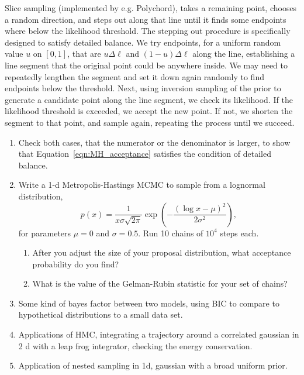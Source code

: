 Slice sampling (implemented by e.g. Polychord), takes a remaining point, chooses a random direction, and steps out along that line until it finds some endpoints where below the likelihood threshold.  The stepping out procedure is specifically designed to satisfy detailed balance.  We try endpoints, for a uniform random value $u$ on $[0,1]$, that are $u \Delta\ell$ and $(1-u) \Delta\ell$ along the line, establishing a line segment that the original point could be anywhere inside.  We may need to repeatedly lengthen the segment and set it down again randomly to find endpoints below the threshold.  Next, using inversion sampling of the prior to generate a candidate point along the line segment, we check its likelihood.  If the likelihood threshold is exceeded, we accept the new point.  If not, we shorten the segment to that point, and sample again, repeating the process until we succeed.


\exercises
\begin{enumerate}

\item Check both cases, that the numerator or the denominator is larger, to show that Equation~\ref{eqn:MH_acceptance} satisfies the condition of detailed balance.

\item Write a 1-d Metropolis-Hastings MCMC to sample from a lognormal distribution,
  $$ p(x) = \frac{ 1 }{ x \sigma\sqrt{2 \pi } } \exp\left( -\frac{ (\log x-\mu)^2 }{2 \sigma^2} \right),$$
  for parameters $\mu = 0$ and $\sigma = 0.5$.  Run 10 chains of $10^4$ steps each.
  \begin{enumerate}
  \item After you adjust the size of your proposal distribution, what acceptance probability do you find?
  \item What is the value of the Gelman-Rubin statistic for your set of chains?
  \end{enumerate}
  
\item Some kind of bayes factor between two models, using BIC to compare to hypothetical distributions to a small data set.

\item Applications of HMC, integrating a trajectory around a correlated gaussian in 2 d with a leap frog integrator, checking the energy conservation.

\item Application of nested sampling in 1d, gaussian with a broad uniform prior.
  
\end{enumerate}
